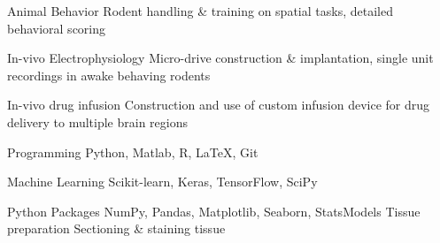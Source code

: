 

\begin{cvskills}

  \cvskill
    {Animal Behavior} %
    {Rodent handling \& training on spatial tasks, detailed behavioral scoring} %

  \cvskill
    {In-vivo Electrophysiology} %
    {Micro-drive construction \& implantation, single unit recordings in awake behaving rodents} %

  \cvskill
    {In-vivo drug infusion} %
    {Construction and use of custom infusion device for drug delivery to multiple brain regions} %

  \cvskill
    {Programming} %
    {Python, Matlab, R, \LaTeX, Git} %
    
  \cvskill
    {Machine Learning} %
    {Scikit-learn, Keras, TensorFlow, SciPy} %
    
  \cvskill
    {Python Packages} %
    {NumPy, Pandas, Matplotlib, Seaborn, StatsModels}
  \cvskill
    {Tissue preparation} %
    {Sectioning \& staining tissue} %

\end{cvskills}



